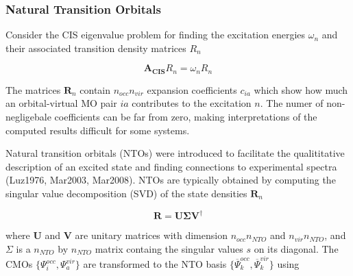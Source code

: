 

\subsubsection*{Natural Transition Orbitals}

Consider the CIS eigenvalue problem for finding the excitation energies $\omega_n$ and their associated transition density matrices $R_n$

\begin{equation}
\mathbf{A_{CIS}} R_n = \omega_n R_n 
\end{equation}

The matrices $\mathbf{R}_n$ contain $n_{occ}n_{vir}$ expansion coefficients $c_{ia}$ which show how much an orbital-virtual MO pair $ia$ contributes to the excitation $n$. The numer of non-negligebale coefficients can be far from zero, making interpretations of the computed results difficult for some systems.

Natural transition orbitals (NTOs) were introduced to facilitate the qualititative description of an excited state and finding connections to experimental spectra (Luz1976, Mar2003, Mar2008). NTOs are typically obtained by computing the singular value decomposition (SVD) of the state densities $\mathbf{R}_n$

\begin{equation}
\mathbf{R} = \mathbf{U} \mathbf{\Sigma} \mathbf{V}^{\dagger}  
\end{equation} 

\noindent where $\mathbf{U}$ and $\mathbf{V}$ are unitary matrices with dimension $n_{occ} n_{NTO}$ and $n_{vir}n_{NTO}$, and $\Sigma$ is a $n_{NTO}$ by $n_{NTO}$ matrix containg the singular values $s$ on its diagonal. The CMOs $\{\Psi^{occ}_i,\Psi^{vir}_a\}$ are transformed to the NTO basis $\{\overline{\Psi}^{occ}_k,\overline{\Psi}^{vir}_k\}$ using

